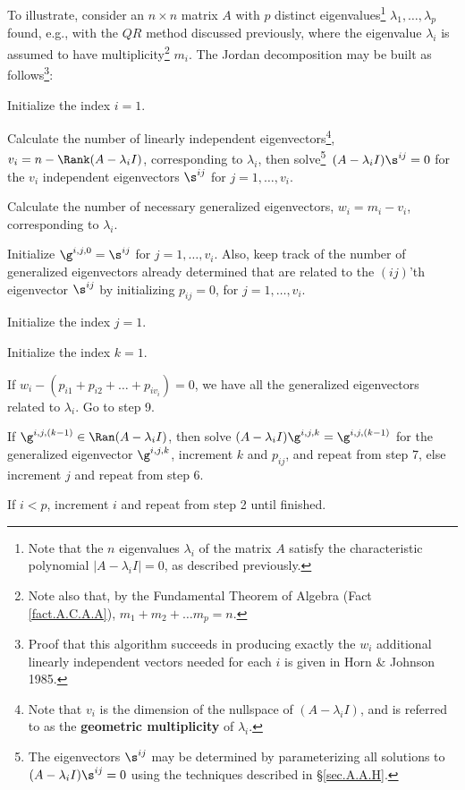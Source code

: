 To illustrate, consider an $n\times n$ matrix $A$ with $p$ distinct eigenvalues\footnote{Note that the
$n$ eigenvalues $\lambda_i$ of the matrix $A$ satisfy the characteristic polynomial $|A-\lambda_i I|=0$, as described previously.}
$\lambda_1, \ldots, \lambda_p$ found, e.g., with the $QR$ method discussed previously, where the eigenvalue $\lambda_i$ is assumed
to have multiplicity\footnote{Note also that,
by the Fundamental Theorem of Algebra (Fact \ref{fact.A.C.A.A}), $m_1+m_2+\ldots m_p=n$.} $m_i$.  The Jordan decomposition 
may be built as follows\footnote{Proof that this algorithm succeeds in producing exactly the $w_i$ additional linearly independent vectors
needed for each $i$ is given in Horn \& Johnson 1985.}:
\beginmylistb
\item[1)] Initialize the index $i=1$.
\item[2)] Calculate the number of linearly independent eigenvectors\footnote{Note that $v_i$ is the dimension of the nullspace of
$(A-\lambda_i I)$, and is referred to as the {\bf geometric multiplicity} of $\lambda_i$.\label{foot:geometricmult}}, $v_i=n-\Rank(A-\lambda_i I)$, corresponding to $\lambda_i$, 
then solve\footnote{The eigenvectors $\s^{ij}$ may be determined by parameterizing all solutions to $(A-\lambda_i I)\s^{ij}=0$
using the techniques described in \S \ref{sec.A.A.H}.}\ 
$(A-\lambda_i I)\s^{ij}=0$ for the $v_i$ independent eigenvectors $\s^{ij}$ for $j=1,\ldots,v_i$.
\item[3)] Calculate the number of necessary generalized eigenvectors, $w_i=m_i-v_i$, corresponding to $\lambda_i$.
\item[4)] Initialize $\g^{i,j,0}=\s^{ij}$ for $j=1,\ldots,v_i$.  Also, keep track of
the number of generalized eigenvectors already determined that are related to the $(ij)$'th eigenvector $\s^{ij}$ by initializing $p_{ij}=0$,
for $j=1,\ldots,v_i$.
\item[5)] Initialize the index $j=1$.  
\item[6)] Initialize the index $k=1$. 
\item[7)] If $w_i-(p_{i1}+p_{i2}+\ldots+p_{i v_i})=0$, we have all the generalized eigenvectors related to $\lambda_i$.  Go to step 9.
\item[8)] If $\g^{i,j,(k-1)}\in \Ran(A-\lambda_i I)$, then solve $(A-\lambda_i I)\g^{i,j,k}=\g^{i,j,(k-1)}$ for the generalized
eigenvector $\g^{i,j,k}$, increment $k$ and $p_{ij}$, and repeat from step 7, else increment $j$ and repeat from step 6.
\item[9)] If $i<p$, increment $i$ and repeat from step 2 until finished.
